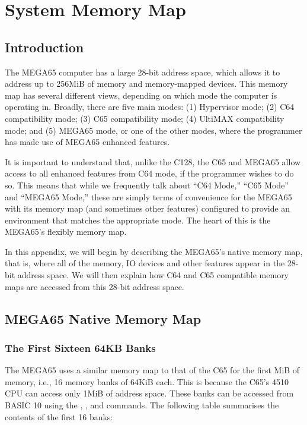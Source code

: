 \chapter{System Memory Map}
\label{cha:memory-map}
\section{Introduction}

The MEGA65 computer has a large 28-bit address space, which allows it
to address up to 256MiB of memory and memory-mapped devices.
This memory map has several different views, depending on which mode
the computer is operating in. Broadly, there are five main modes:
(1) Hypervisor mode; (2) C64 compatibility mode; (3) C65 compatibility mode; (4) UltiMAX
compatibility mode; and (5) MEGA65 mode, or one of the other modes,
where the programmer has made use of MEGA65 enhanced features.

It is important to understand that, unlike the C128, the C65 and
MEGA65 allow access to all enhanced features from C64 mode, if the
programmer wishes to do so.  This means that while we frequently talk
about ``C64 Mode,'' ``C65 Mode'' and ``MEGA65 Mode,'' these are simply
terms of convenience for the MEGA65 with its memory map (and sometimes
other features) configured to provide an environment that matches
the appropriate mode.  The heart of this is the MEGA65's flexibly
memory map.

In this appendix, we will begin by describing the MEGA65's native
memory map, that is, where all of the memory, IO devices and other
features appear in the 28-bit address space. We will then explain how
C64 and C65 compatible memory maps are accessed from this 28-bit
address space.

\newpage

\section{MEGA65 Native Memory Map}

\subsection{The First Sixteen 64KB Banks}

The MEGA65 uses a similar memory map to that of the C65 for the first
MiB of memory, i.e., 16 memory banks of 64KiB each.
This is because the C65's 4510 CPU can access only 1MiB
of address space.  These banks can be accessed from BASIC 10 using the
,
,  and 
commands.  The following table summarises the contents of the first
16 banks:

